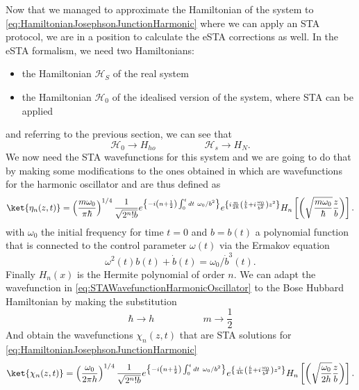 Now that we managed to approximate the Hamiltonian of the system to \cref{eq:HamiltonianJosephsonJunctionHarmonic} where we can apply an STA protocol, we are in a position to calculate the eSTA corrections as well.
In the eSTA formalism, we need two Hamiltonians:
\begin{itemize}
	\item the Hamiltonian $ \mathcal{H}_{S} $ of the real system
	\item the Hamiltonian $ \mathcal{H}_{0} $ of the idealised version of the system, where STA can be applied
\end{itemize}
and referring to the previous section, we can see that
\begin{equation}
	\label{eq:eSTAJJcomparison}
	\mathcal{H}_{0} \rightarrow H_{ho} \hspace{5em} \mathcal{H}_{s} \rightarrow H_{N} .
\end{equation}
We now need the STA wavefunctions for this system and we are going to do that by making some modifications to the ones obtained in \cite{FastOptimalFrChen2010} which are wavefunctions for the harmonic oscillator and are thus defined as
\begin{equation}
	\label{eq:STAWavefunctionHarmonicOscillator}
	\ket{\eta_{n}(z,t)} =
	\left(\frac{m\omega_{0}}{ \pi\hbar}\right)^{1/4} %
	\frac{1}{\sqrt{2^{n}!b} }e^{\left\{-i\left(n+\frac{1}{2}\right)\int_{0}^{t}dt~\omega_{0}/b^2\right\}} %
	e^{\left\{ i \frac{m}{2\hbar }\left(\frac{\dot{ b }}{b} + i\frac{\omega_{0}}{b^2}\right)z^2 \right\} } %
	H_{n}\left[\left(\sqrt{\frac{m\omega_{0}}{\hbar }} \frac{z}{b}\right)\right] %
	.
\end{equation}
with $ \omega_{0} $ the initial frequency for time $ t = 0 $ and $ b = b(t) $ a polynomial function that is connected to the control parameter $ \omega(t) $ via the Ermakov equation
\begin{equation}
	\label{eq:Ermakov}
	\omega^2(t)b(t) + \dot{ b }(t) = \omega_{0}/\dot{b}^{3}(t).
\end{equation}
Finally $ H_n(x) $ is the Hermite polynomial of order $ n $.
We can adapt the wavefunction in \cref{eq:STAWavefunctionHarmonicOscillator} to the Bose Hubbard Hamiltonian by making the substitution
\begin{equation}
	\label{eq:SubstitutionHarmonicOscillatorBoseHubbard}
	\hbar \rightarrow h \hspace{5em} m \rightarrow \frac{1}{2}
\end{equation}
And obtain the wavefunctions $ \chi_{n}(z,t) $ that are STA solutions for \cref{eq:HamiltonianJosephsonJunctionHarmonic}
\begin{equation}
	\label{eq:STAWavefunctionBoseHubbard}
	\ket{\chi_{n}(z,t)} =
	\left(\frac{\omega_{0}}{ 2\pi h}\right)^{1/4} %
	\frac{1}{\sqrt{2^{n}!b} }e^{\left\{-i\left(n+\frac{1}{2}\right)\int_{0}^{t}dt~\omega_{0}/b^2\right\}} %
	e^{\left\{  \frac{i}{4h }\left(\frac{\dot{ b }}{b} + i\frac{\omega_{0}}{b^2}\right)z^2 \right\} } %
	H_{n}\left[\left(\sqrt{\frac{\omega_{0}}{2h }} \frac{z}{b}\right)\right] %
	.
\end{equation}
